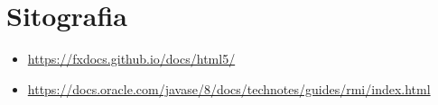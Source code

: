 \section{Sitografia}
\begin{itemize}
    \item \url{https://fxdocs.github.io/docs/html5/}
    \item \url{https://docs.oracle.com/javase/8/docs/technotes/guides/rmi/index.html}
\end{itemize}
